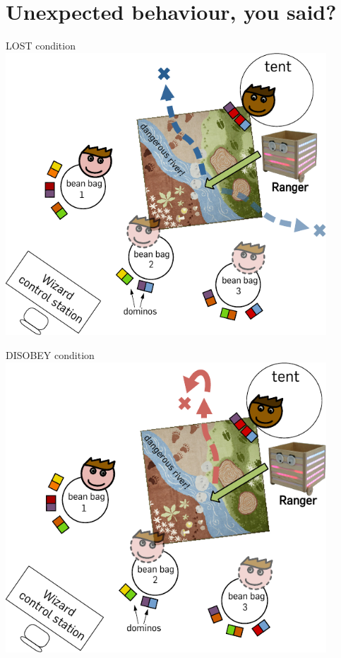 \documentclass[compress]{beamer}
\begin{document}
\section{Unexpected behaviour, you said?}


\begin{frame}{LOST condition}
    \centering
     {
        \includegraphics[width=0.9\textwidth]{domino-setup-lost}
    }
\end{frame}

\begin{frame}{DISOBEY condition}
        \centering
        \includegraphics[width=0.9\textwidth]{domino-setup-disobey}
\end{frame}
\end{document}
